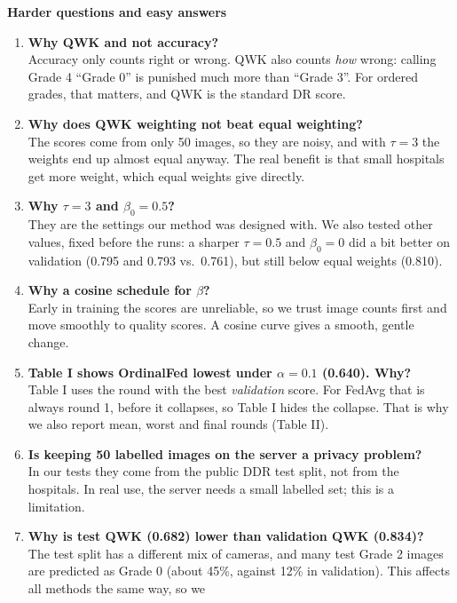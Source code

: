 \documentclass[11pt,a4paper]{article}
\begin{document}
{\color{navy}\Large\bfseries Harder questions and easy answers}
\begin{enumerate}[leftmargin=*,itemsep=6pt]
  \item \textbf{Why QWK and not accuracy?}\\
  Accuracy only counts right or wrong. QWK also counts \emph{how} wrong: calling Grade 4 ``Grade 0''
  is punished much more than ``Grade 3''. For ordered grades, that matters, and QWK is the standard DR
  score.
  \item \textbf{Why does QWK weighting not beat equal weighting?}\\
  The scores come from only 50 images, so they are noisy, and with $\tau = 3$ the weights end up
  almost equal anyway. The real benefit is that small hospitals get more weight, which equal weights
  give directly.
  \item \textbf{Why $\tau = 3$ and $\beta_0 = 0.5$?}\\
  They are the settings our method was designed with. We also tested other values, fixed before the
  runs: a sharper $\tau = 0.5$ and $\beta_0 = 0$ did a bit better on validation (0.795 and 0.793 vs.\
  0.761), but still below equal weights (0.810).
  \item \textbf{Why a cosine schedule for $\beta$?}\\
  Early in training the scores are unreliable, so we trust image counts first and move smoothly to
  quality scores. A cosine curve gives a smooth, gentle change.
  \item \textbf{Table I shows OrdinalFed lowest under $\alpha = 0.1$ (0.640). Why?}\\
  Table I uses the round with the best \emph{validation} score. For FedAvg that is always round 1,
  before it collapses, so Table I hides the collapse. That is why we also report mean, worst and
  final rounds (Table II).
  \item \textbf{Is keeping 50 labelled images on the server a privacy problem?}\\
  In our tests they come from the public DDR test split, not from the hospitals. In real use, the
  server needs a small labelled set; this is a limitation.
  \item \textbf{Why is test QWK (0.682) lower than validation QWK (0.834)?}\\
  The test split has a different mix of cameras, and many test Grade 2 images are predicted as
  Grade 0 (about 45\%, against 12\% in validation). This affects all methods the same way, so we

\end{enumerate}
\end{document}
